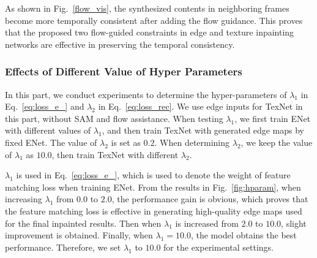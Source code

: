 As shown in Fig.~\ref{flow_vis}, the synthesized contents in neighboring frames become more temporally consistent after adding the flow guidance.
This proves that the proposed two flow-guided constraints in edge and texture inpainting networks are effective in preserving the temporal consistency.


 


\subsubsection{Effects of Different Value of Hyper Parameters}
In this part, we conduct experiments to determine the hyper-parameters of $\lambda_1$ in Eq.~\eqref{eq:loss_e_} and $\lambda_2$ in Eq.~\eqref{eq:loss_rec}. We use edge inputs for TexNet in this part, without SAM and flow assistance.
When testing $\lambda_1$, we first train ENet with different values of $\lambda_1$, and then train TexNet with generated edge maps by fixed ENet. The value of $\lambda_2$ is set as $0.2$. 
When determining $\lambda_2$, we keep the value of $\lambda_1$ as $10.0$, then train TexNet with different $\lambda_2$.

$\lambda_1$ is used in Eq.~\eqref{eq:loss_e_}, which is used to denote the weight of feature matching loss when training ENet. %
From the results in Fig.~\ref{fig:hparam}, when increasing $\lambda_1$ from $0.0$ to $2.0$, the performance gain is obvious, which proves that the feature matching loss is effective in
generating high-quality edge maps used for the final inpainted results. 
Then when $\lambda_1$ is increased from $2.0$ to $10.0$, slight improvement is obtained.
Finally, when $\lambda_1=10.0$, the model obtains the best performance.
Therefore, we set $\lambda_1$ to $10.0$ for the experimental settings.

